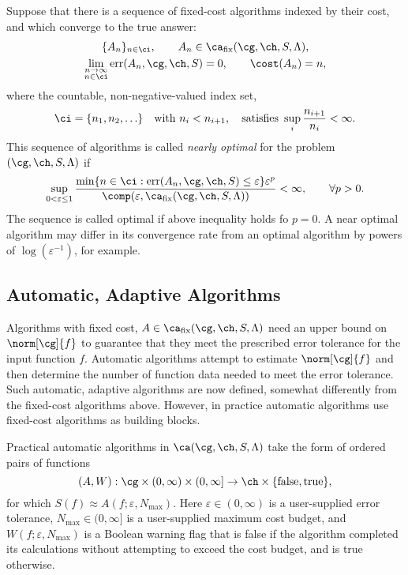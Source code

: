 \documentclass[final]{elsarticle}
\DeclareMathOperator{\err}{err}
\theoremstyle{definition}
\theoremstyle{remark}
\DeclareMathOperator{\fix}{fix}
\begin{document}
Suppose that there is a sequence of fixed-cost algorithms indexed by their cost, and which converge to the true answer:
\begin{subequations} \label{algseqdef}
\begin{gather} 
\{A_n\}_{n \in \ci}, \qquad A_n  \in \ca_{\fix}(\cg,\ch,S,\Lambda), \\
\lim_{\substack{n \to \infty\\ n \in \ci}} \err(A_n,\cg,\ch,S) = 0, \qquad \cost(A_n) = n,  
\end{gather}
\end{subequations}
where the countable, non-negative-valued index set, 
\begin{equation} \label{indexdef}
\ci=\{n_1, n_2, \ldots\} \quad \text{with } n_i < n_{i+1}, \quad \text{satisfies } \sup_i \frac{n_{i+1}}{n_i} <\infty. 
\end{equation} 
This sequence of algorithms is called \emph{nearly optimal} for the problem $(\cg,\ch,S,\Lambda)$ if 
\begin{equation} \label{nearoptdef}
\sup_{0 < \varepsilon \le 1} \frac{\min\{n \in \ci : \err(A_n,\cg,\ch,S) \le \varepsilon\} \varepsilon^p}{\comp(\varepsilon,\ca_{\fix}(\cg,\ch,S,\Lambda))} <\infty, \qquad \forall p>0.
\end{equation}
The sequence is called optimal if above inequality holds fo $p=0$.  A near optimal algorithm may differ in its convergence rate from an optimal algorithm by powers of $\log(\varepsilon^{-1})$, for example.


\subsection{Automatic, Adaptive Algorithms}

Algorithms with fixed cost, $A \in \ca_{\fix}(\cg,\ch,S,\Lambda)$ need an upper bound on $\norm[\cg]{f}$ to guarantee that they meet the prescribed error tolerance for the input function $f$.  Automatic algorithms attempt to estimate $\norm[\cg]{f}$ and then determine the number of function data needed to meet the error tolerance.  Such automatic, adaptive algorithms are now defined, somewhat differently from the fixed-cost algorithms above.  However, in practice automatic algorithms use fixed-cost algorithms as building blocks.

Practical automatic algorithms in $\ca(\cg,\ch,S,\Lambda)$ take the form of ordered pairs of functions
\[
(A,W): \cg \times (0,\infty)\times (0,\infty] \to \ch \times \{\text{false},\text{true}\},
\]
for which $S(f) \approx A(f;\varepsilon,N_{\max})$.  Here $\varepsilon \in (0,\infty)$ is a user-supplied error tolerance, $N_{\max} \in (0,\infty]$ is a user-supplied maximum cost budget, and $W(f;\varepsilon,N_{\max})$ is a Boolean warning flag that is false if the algorithm completed its calculations without attempting to exceed the cost budget, and is true otherwise.  
\end{document}

